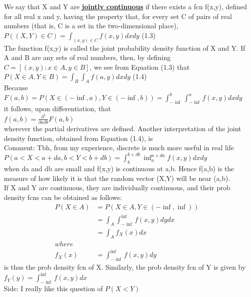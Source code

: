\documentclass{article}
\begin{document}
We say that X and Y are \underline{\textbf{jointly continuous}} if there exists a fcn f(x,y), defined for all real x and y, having the property that, for every set C of pairs of real numbers (that is, C is a set in the two-dimensional place),\\
$P((X,Y)\in C) = \int_{(x,y)\in C} f(x,y)dx dy $ (1.3)\\ 
The function f(x,y) is called the joint probability density function of X and Y. If A and B are any sets of real numbers, then, by defining $C=[(x,y):x \in A, y \in B]$, we see from Equation (1.3) that \\
$P(X \in A, Y \in B) = \int_{B}\int_{A}f(a,y)dx dy$ (1.4) \\ 
Because \\
$F(a,b) = P(X \in (-\inf, a), Y \in (-\inf, b)) = \int_{-\inf}^{b}\int_{-\inf}^{a}f(x,y)dx dy$ \\ 
it follows, upon differentiation, that \\
$f(a,b) = \frac{\partial^2}{\partial a \partial b}F(a, b)$\\
wherever the partial derivatives are defined. Another interpretation of the joint density function, obtained from Equation (1.4), is \\
Comment: Tbh, from my experience, discrete is much more useful in real life \\
$P(a < X < a + da, b < Y < b + db) = \int_{b}^{b + db} \inf_{a}^{a + da} f(x,y) dx dy$\\
when da and db are small and f(x,y) is continuous at a,b. Hence f(a,b) is the measure of how likely it is that the random vector (X,Y) will be near (a,b). \\
If X and Y are continuous, they are individually continuous, and their prob density fcns can be obtained as follows: 
\begin{align*}
P(X \in A)  &= P(X \in A, Y \in (-\inf, \inf)) \\ 
            &= \int_{A}\int_{-\inf}^{\inf}f(x,y)dy dx \\ 
            &= \int_{A}f_X(x)dx \\ 
where \\
f_X(x)      &= \int_{-\inf}^{\inf}f(x,y)dy
\end{align*}
is thus the prob density fcn of X. Similarly, the prob density fcn of Y is given by \\
$f_Y(y) = \int_{-\inf}^{\inf}f(x,y)dx$\\
Side: I really like this question of $P(X < Y)$ \\ 
\end{document}

